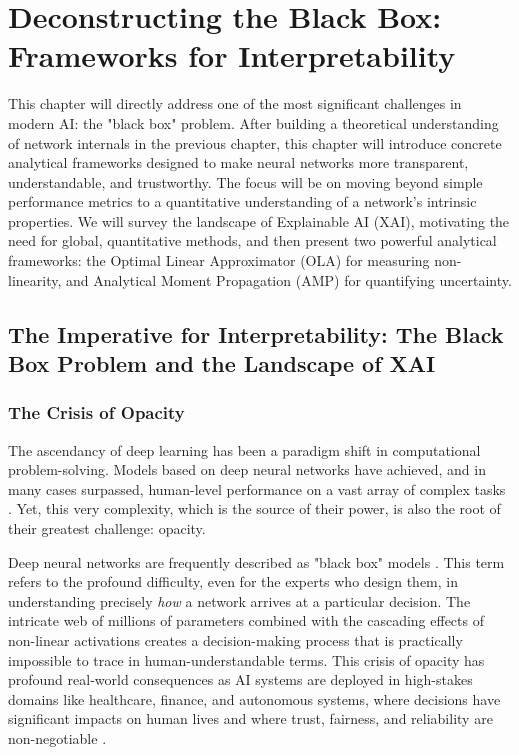 \ifdefined\ispartofbook
\else
  
  
\fi

\chapter{Deconstructing the Black Box: Frameworks for Interpretability}
\label{chap:interpretability}

This chapter will directly address one of the most significant challenges in modern AI: the "black box" problem. After building a theoretical understanding of network internals in the previous chapter, this chapter will introduce concrete analytical frameworks designed to make neural networks more transparent, understandable, and trustworthy. The focus will be on moving beyond simple performance metrics to a quantitative understanding of a network's intrinsic properties. We will survey the landscape of Explainable AI (XAI), motivating the need for global, quantitative methods, and then present two powerful analytical frameworks: the Optimal Linear Approximator (OLA) for measuring non-linearity, and Analytical Moment Propagation (AMP) for quantifying uncertainty.

\section{The Imperative for Interpretability: The Black Box Problem and the Landscape of XAI}
\label{sec:xai_landscape}

\subsection{The Crisis of Opacity}
The ascendancy of deep learning has been a paradigm shift in computational problem-solving. Models based on deep neural networks have achieved, and in many cases surpassed, human-level performance on a vast array of complex tasks \cite{Goodfellow2016Book}. Yet, this very complexity, which is the source of their power, is also the root of their greatest challenge: opacity.

Deep neural networks are frequently described as "black box" models \cite{Rudin2019StopExplaining}. This term refers to the profound difficulty, even for the experts who design them, in understanding precisely \textit{how} a network arrives at a particular decision. The intricate web of millions of parameters combined with the cascading effects of non-linear activations creates a decision-making process that is practically impossible to trace in human-understandable terms. This crisis of opacity has profound real-world consequences as AI systems are deployed in high-stakes domains like healthcare, finance, and autonomous systems, where decisions have significant impacts on human lives and where trust, fairness, and reliability are non-negotiable \cite{AdadiBerrada2018XAISurvey}.

